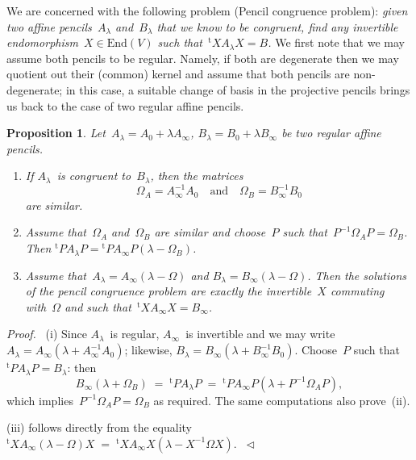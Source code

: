 \documentclass{article}
\newtheorem{prop}{Proposition}
\newenvironment{proof}{\textit{Proof.}~}{~$\lhd$}
\def\transpose#1{{}^{\mathrm{t}}\!#1}
\def\End{\mathrm{End}}
\begin{document}
We are concerned with the following problem (Pencil congruence problem):
\emph{given two affine pencils~$A_{\lambda}$ and~$B_{\lambda}$ that we know to be
congruent, find any invertible endomorphism~$X \in \End(V)$ such
that~$\transpose{X} A_{\lambda} X = B$.} We first note that we may assume both
pencils to be regular. Namely, if both are degenerate then we may
quotient out their (common) kernel and assume that both pencils are
non-degenerate; in this case, a suitable change of basis in the projective
pencils brings us back to the case of two regular affine pencils.

\begin{prop}
Let~$A_{\lambda} = A_0 + \lambda A_{\infty}$, $B_{\lambda} = B_{0} + \lambda B_{\infty}$ be two
regular affine pencils.
\begin{enumerate}
\item If $A_{\lambda}$~is congruent to~$B_{\lambda}$, then the matrices
\[ \Omega_{A} = A_{\infty}^{-1} A_0 \quad\text{and}\quad \Omega_{B} = B_{\infty}^{-1} B_0 \]
are similar.
\item Assume that~$\Omega_{A}$ and~$\Omega_{B}$ are similar and
choose~$P$ such that~$P^{-1} \Omega_{A} P = \Omega_{B}$. Then
$\transpose{P} A_{\lambda} P =
\transpose{P} A_{\infty} P (\lambda - \Omega_{B})$.
\item Assume that~$A_{\lambda} = A_{\infty} (\lambda - \Omega)$ and $B_{\lambda} = B_{\infty} (\lambda - \Omega)$.
Then the solutions of the pencil congruence problem are exactly the
invertible~$X$ commuting with~$\Omega$ and such that~$\transpose{X} A_{\infty} X =
B_{\infty}$.
\end{enumerate}
\end{prop}

\begin{proof}
(i)
Since $A_{\lambda}$~is regular, $A_{\infty}$~is invertible and we may write $A_{\lambda} =
A_{\infty} (\lambda + A_{\infty}^{-1} A_0)$; likewise, $B_{\lambda} = B_{\infty} (\lambda + B_{\infty}^{-1}
B_0)$. Choose~$P$ such that~$\transpose{P} A_{\lambda} P = B_{\lambda}$: then
\begin{equation}
B_{\infty} (\lambda + \Omega_B) \;=\; \transpose{P} A_{\lambda} P \;=\;
\transpose{P} A_{\infty} P (\lambda + P^{-1} \Omega_A P),
\end{equation}
which implies~$P^{-1} \Omega_A P = \Omega_B$ as required. The same
computations also prove~(ii).

(iii) follows directly from the equality
$\transpose{X} A_{\infty} (\lambda - \Omega) X \;=\;
\transpose{X} A_{\infty} X (\lambda - X^{-1} \Omega X)$.
\end{proof}
\end{document}
